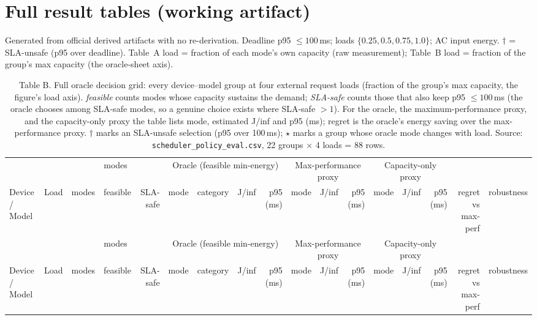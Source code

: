 \documentclass[10pt]{article}
\begin{document}
\section*{Full result tables (working artifact)}
\noindent Generated from official derived artifacts with no re-derivation. Deadline p95 $\le 100$\,ms; loads $\{0.25,0.5,0.75,1.0\}$; AC input energy. $\dagger$ = SLA-unsafe (p95 over deadline). Table~A load = fraction of each mode's own capacity (raw measurement); Table~B load = fraction of the group's max capacity (the oracle-sheet axis).\par\medskip
\begin{center}\tiny
\setlength{\tabcolsep}{2pt}
\begin{longtable}{@{}l l r r r l l r r l r r l r r r l@{}}
\caption{Table B. Full oracle decision grid: every device--model group at four external request loads (fraction of the group's max capacity, the figure's load axis). \emph{feasible} counts modes whose capacity sustains the demand; \emph{SLA-safe} counts those that also keep p95 $\le 100$\,ms (the oracle chooses among SLA-safe modes, so a genuine choice exists where SLA-safe $> 1$). For the oracle, the maximum-performance proxy, and the capacity-only proxy the table lists mode, estimated J/inf and p95 (ms); regret is the oracle's energy saving over the max-performance proxy. $\dagger$ marks an SLA-unsafe selection (p95 over 100\,ms); $\star$ marks a group whose oracle mode changes with load. Source: \texttt{scheduler\_policy\_eval.csv}, 22 groups $\times$ 4 loads = 88 rows.}\\
\toprule
& & \multicolumn{3}{c}{modes} & \multicolumn{4}{c}{Oracle (feasible min-energy)} & \multicolumn{3}{c}{Max-performance proxy} & \multicolumn{3}{c}{Capacity-only proxy} & & \\
\cmidrule(lr){3-5}\cmidrule(lr){6-9}\cmidrule(lr){10-12}\cmidrule(lr){13-15}
Device / Model & Load & modes & feasible & SLA-safe & mode & category & J/inf & p95 (ms) & mode & J/inf & p95 (ms) & mode & J/inf & p95 (ms) & regret vs max-perf & robustness \\
\midrule\endfirsthead
\toprule
& & \multicolumn{3}{c}{modes} & \multicolumn{4}{c}{Oracle (feasible min-energy)} & \multicolumn{3}{c}{Max-performance proxy} & \multicolumn{3}{c}{Capacity-only proxy} & & \\
\cmidrule(lr){3-5}\cmidrule(lr){6-9}\cmidrule(lr){10-12}\cmidrule(lr){13-15}
Device / Model & Load & modes & feasible & SLA-safe & mode & category & J/inf & p95 (ms) & mode & J/inf & p95 (ms) & mode & J/inf & p95 (ms) & regret vs max-perf & robustness \\

\end{longtable}
\end{center}
\end{document}
